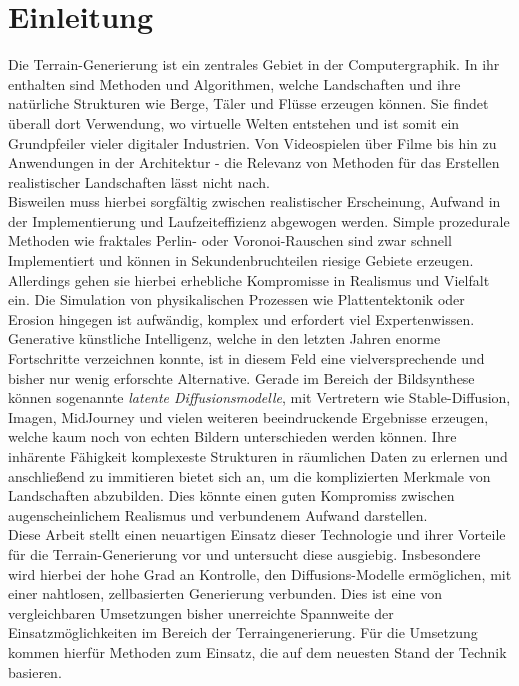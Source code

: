 \chapter{Einleitung}



Die Terrain-Generierung ist ein zentrales Gebiet in der Computergraphik. In ihr enthalten sind Methoden und Algorithmen, welche Landschaften und ihre natürliche Strukturen wie Berge, Täler und Flüsse erzeugen können. Sie findet überall dort Verwendung, wo virtuelle Welten entstehen und ist somit ein Grundpfeiler vieler digitaler Industrien. Von Videospielen über Filme bis hin zu Anwendungen in der Architektur - die Relevanz von Methoden für das Erstellen realistischer Landschaften lässt nicht nach. \\
Bisweilen muss hierbei sorgfältig zwischen realistischer Erscheinung, Aufwand in der Implementierung und Laufzeiteffizienz abgewogen werden. Simple prozedurale Methoden wie fraktales Perlin- oder Voronoi-Rauschen sind zwar schnell Implementiert und können in Sekundenbruchteilen riesige Gebiete erzeugen. Allerdings gehen sie hierbei erhebliche Kompromisse in Realismus und Vielfalt ein. Die Simulation von physikalischen Prozessen wie Plattentektonik oder Erosion hingegen ist aufwändig, komplex und erfordert viel Expertenwissen. \\
Generative künstliche Intelligenz, welche in den letzten Jahren enorme Fortschritte verzeichnen konnte, ist in diesem Feld eine vielversprechende und bisher nur wenig erforschte Alternative. Gerade im Bereich der Bildsynthese können sogenannte \textit{latente Diffusionsmodelle}, mit Vertretern wie Stable-Diffusion, Imagen, MidJourney und vielen weiteren beeindruckende Ergebnisse erzeugen, welche kaum noch von echten Bildern unterschieden werden können.
Ihre inhärente Fähigkeit komplexeste Strukturen in räumlichen Daten zu erlernen und anschließend zu immitieren bietet sich an, um die komplizierten Merkmale von Landschaften abzubilden. Dies könnte einen guten Kompromiss zwischen augenscheinlichem Realismus und verbundenem Aufwand darstellen. \\
Diese Arbeit stellt einen neuartigen Einsatz dieser Technologie und ihrer Vorteile für die Terrain-Generierung vor und untersucht diese ausgiebig. Insbesondere wird hierbei der hohe Grad an Kontrolle, den Diffusions-Modelle ermöglichen, mit einer nahtlosen, zellbasierten Generierung verbunden. Dies ist eine von vergleichbaren Umsetzungen bisher unerreichte Spannweite der Einsatzmöglichkeiten im Bereich der Terraingenerierung. Für die Umsetzung kommen hierfür Methoden zum Einsatz, die auf dem neuesten Stand der Technik basieren.
 
